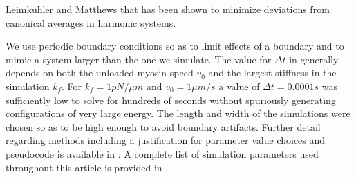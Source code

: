 \documentclass[12pt]{article}
\begin{document}
Leimkuhler and Matthews \cite{leimkuhler2012,leimkuhler2013} that has
been shown to minimize deviations from canonical averages in harmonic systems.
\par
We use periodic boundary conditions so as to limit effects of a
boundary and to mimic a system larger than the one we simulate. The value for 
$\Delta t$ in generally depends on both the unloaded myosin 
speed
$v_0$ and the largest stiffness in the simulation $k_f$. For $k_f = 1pN/\mu m$
and $v_0=1\mu m/s$ a value of $\Delta t = 0.0001 s$ was sufficiently low to
solve  for hundreds of seconds without spuriously
generating configurations of very large energy. The length and width of the
simulations were chosen so as to be high enough to avoid boundary artifacts. 
Further detail regarding methods including a justification for parameter
value choices and pseudocode is available in \cite{freedman2016}.
A complete list of simulation parameters used throughout this
article is provided in . 
\end{document}
